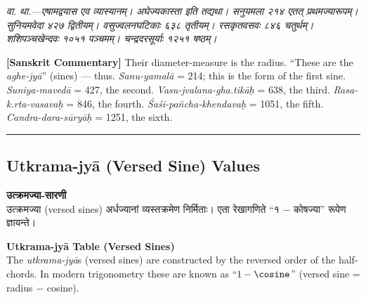 \documentclass[11pt,a4paper]{book}
\newcommand{\dev}[1]{{\devanagarifont #1}}
\newcommand{\bilingual}[2]{%
  \par\vspace{0.6em}%
  \noindent\begin{minipage}[t]{0.48\textwidth}
    \RaggedRight
    #1%
  \end{minipage}%
  \hfill
  \begin{minipage}[t]{0.48\textwidth}
    \RaggedRight
    #2%
  \end{minipage}%
  \par\vspace{0.6em}%
}
\newcommand{\sktcommbilingual}[2]{%
  \par\vspace{0.5em}%
  \noindent\begin{minipage}[t]{0.48\textwidth}
    \RaggedRight\small\itshape
    \dev{#1}
  \end{minipage}%
  \hfill
  \begin{minipage}[t]{0.48\textwidth}
    \RaggedRight\small
    #2%
  \end{minipage}%
  \par\vspace{0.5em}%
}
\newcommand{\secdivider}{%
  \begin{center}\rule{0.4\textwidth}{0.5pt}\end{center}%
}
\begin{document}
\vspace{0.5em}

\sktcommbilingual{%
\dev{वा. था.}---एषामद्वयास एव व्यास्यानम्‌। अघेज्यकास्ता इति तद्यथा। सनुयमला २१४ एतत्‌ प्रथमज्यारूपम्‌। सुनियमवेदा ४२७ द्वितीयम्‌। वसुज्वलनघटिकाः ६३८ तृतीयम्‌। रसकृतवसवः ८४६ चतुर्थम्‌। शशिपञ्चखेन्दवः १०५१ पञ्चमम्‌। चन्द्रदरसूर्याः १२५१ षष्ठम्‌।
}{%
\textbf{[Sanskrit Commentary]} Their diameter-measure is the radius. ``These are the \textit{aghe-jyā}'' (sines) --- thus. \textit{Sanu-yamalā} = 214; this is the form of the first sine. \textit{Suniya-mavedā} = 427, the second. \textit{Vasu-jvalana-gha.tikāḥ} = 638, the third. \textit{Rasa-k.rta-vasavaḥ} = 846, the fourth. \textit{Śaśi-pañcha-khendavaḥ} = 1051, the fifth. \textit{Candra-dara-sūryāḥ} = 1251, the sixth.
}

\secdivider
\clearpage

\subsection*{Utkrama-jyā (Versed Sine) Values}

\bilingual{%
\textbf{\dev{उत्क्रमज्या-सारणी}}\\[0.2em]
\dev{उत्क्रमज्या} (versed sines) अर्धज्यानां व्यस्तक्रमेण निर्मिताः। एता रेखागणिते ``१ $-$ कोषज्या'' रूपेण ज्ञायन्ते।
}{%
\textbf{Utkrama-jyā Table (Versed Sines)}\\[0.2em]
The \textit{utkrama-jyā}s (versed sines) are constructed by the reversed order of the half-chords. In modern trigonometry these are known as ``$1 - \cosine$'' (versed sine = radius $-$ cosine).
}

\vspace{0.5em}
\end{document}
